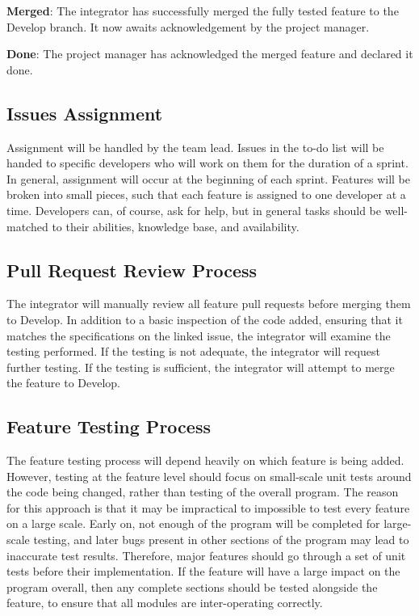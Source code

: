 \textbf{Merged}: The integrator has successfully merged the fully tested feature to the Develop branch. It now awaits acknowledgement by the project manager.

\textbf{Done}: The project manager has acknowledged the merged feature and declared it done.

\subsection{Issues Assignment}

Assignment will be handled by the team lead. Issues in the to-do list will be handed to specific developers who will work on them for the duration of a sprint. In general, assignment will occur at the beginning of each sprint. Features will be broken into small pieces, such that each feature is assigned to one developer at a time. Developers can, of course, ask for help, but in general tasks should be well-matched to their abilities, knowledge base, and availability.

\subsection{Pull Request Review Process}

The integrator will manually review all feature pull requests before merging them to Develop. In addition to a basic inspection of the code added, ensuring that it matches the specifications on the linked issue, the integrator will examine the testing performed. If the testing is not adequate, the integrator will request further testing. If the testing is sufficient, the integrator will attempt to merge the feature to Develop.

\subsection{Feature Testing Process}

The feature testing process will depend heavily on which feature is being added. However, testing at the feature level should focus on small-scale unit tests around the code being changed, rather than testing of the overall program. The reason for this approach is that it may be impractical to impossible to test every feature on a large scale. Early on, not enough of the program will be completed for large-scale testing, and later bugs present in other sections of the program may lead to inaccurate test results. Therefore, major features should go through a set of unit tests before their implementation. If the feature will have a large impact on the program overall, then any complete sections should be tested alongside the feature, to ensure that all modules are inter-operating correctly.

